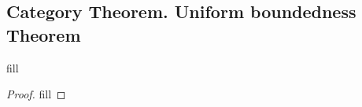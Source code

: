 \subsection{Category Theorem. Uniform boundedness Theorem}

\begin{exercise}{1}
fill
\end{exercise}
\begin{proof}
fill
\end{proof}